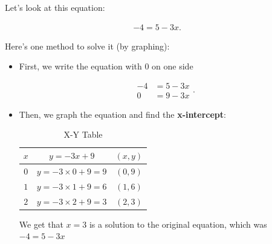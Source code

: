 \label{les_3_unit_1:solve_linear_equation_by_graphing}

Let's look at this equation:

\begin{align}
  -4 = 5 - 3x
.\end{align}

Here's one method to solve it (by graphing):

\begin{marginfigure}
  \centering
  \label{fig:solution_by_graphing}
\end{marginfigure}

\begin{itemize}
  \label{item:solution_by_graphing}

  \item First, we write the equation with $0$ on one side

    \begin{equation}
      \begin{split}
        -4  &= 5 - 3x \\
        0   &= 9 - 3x
      \end{split}
    .\end{equation}

  \item Then, we graph the equation and find the \textbf{x-intercept}:

    \begin{table}[h]
      \centering
      \begin{tabular}{|c|c|c|}
        \hline
        $x$ & $y = -3x + 9$ & $(x, y)$ \\
        \hline
        $0$ & $y = -3 \times 0 + 9 = 9$ & $(0, 9)$ \\ 
        \hline
        $1$ & $y = -3 \times 1 + 9 = 6$ & $(1, 6)$ \\
        \hline
        $2$ & $y = -3 \times 2 + 9 = 3$ & $(2, 3)$ \\
        \hline
      \end{tabular}
      \caption{X-Y Table}
      \label{table:x_y_table}
    \end{table}

    We get that $x = 3$ is a solution to the original equation, which was
    $-4 = 5 -3x$
\end{itemize}

\newpage
